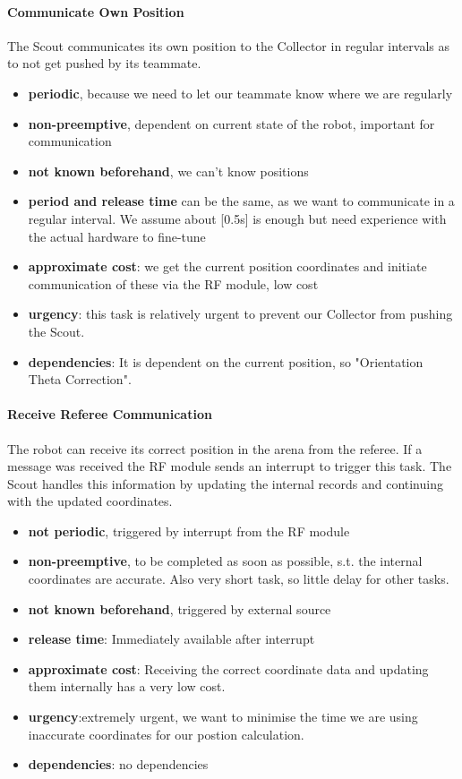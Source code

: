 \documentclass[12pt]{article}
\begin{document}
\paragraph{Communicate Own Position}
The Scout communicates its own position to the Collector in regular intervals as to not get pushed by its teammate. 
\begin{itemize}
	\item \textbf{periodic}, because we need to let our teammate know where we are regularly
	\item \textbf{non-preemptive}, dependent on current state of the robot, important for communication
	\item \textbf{not known beforehand}, we can't know positions
	\item \textbf{period and release time} can be the same, as we want to communicate in a regular interval. We assume about [0.5s] is enough but need experience with the actual hardware to fine-tune
	\item \textbf{approximate cost}: we get the current position coordinates and initiate communication of these via the RF module, low cost
	\item \textbf{urgency}: this task is relatively urgent to prevent our Collector from pushing the Scout.
	\item \textbf{dependencies}: It is dependent on the current position, so "Orientation Theta Correction".
\end{itemize}

\paragraph{Receive Referee Communication}
The robot can receive its correct position in the arena from the referee. If a message was received the RF module sends an interrupt to trigger this task. The Scout handles this information by updating the internal records and continuing with the updated coordinates.
\begin{itemize}
	\item \textbf{not periodic}, triggered by interrupt from the RF module
	\item \textbf{non-preemptive}, to be completed as soon as possible, s.t. the internal coordinates are accurate. Also very short task, so little delay for other tasks.
	\item \textbf{not known beforehand}, triggered by external source
	\item \textbf{release time}: Immediately available after interrupt
	\item \textbf{approximate cost}: Receiving the correct coordinate data and updating them internally has a very low cost.
	\item \textbf{urgency}:extremely urgent, we want to minimise the time we are using inaccurate coordinates for our postion calculation.
	\item \textbf{dependencies}: no dependencies
\end{itemize}
\newpage
\end{document}
